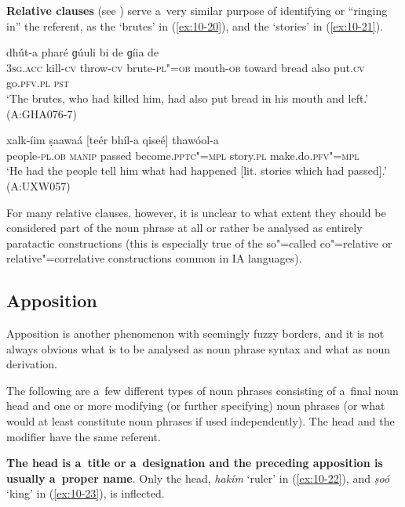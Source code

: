 \textbf{Relative clauses} (see ) serve a~very similar purpose of identifying or ``ringing in''
the referent, as the `brutes' in (\ref{ex:10-20}), and the `stories' in (\ref{ex:10-21}).

\begin{exe}
\ex
\label{ex:10-20}
\gll [tas mheer-í ɡal-í zaalim"=aan-óom] dhút-a pharé ɡúuli bi de ɡíia de \\
\textsc{3sg.acc} kill-\textsc{cv} throw-\textsc{cv} brute-\textsc{pl"=ob} mouth-\textsc{ob} toward  bread also put.\textsc{cv} go.\textsc{pfv.pl} \textsc{pst} \\
\glt `The brutes, who had killed him, had also put bread in his mouth and left.' (A:GHA076-7)

\ex
\label{ex:10-21}
\gll xalk-íim ṣaawaá [teér bhíl-a qiseé] thawóol-a \\
people-\textsc{pl.ob} \textsc{manip} passed become.\textsc{pptc"=mpl} story.\textsc{pl} make.do.\textsc{pfv"=mpl} \\
\glt `He had the people tell him what had happened [lit. stories which had passed].' (A:UXW057)
\end{exe}

For many relative clauses, however, it is unclear to what extent they should be considered part of the noun phrase at all or rather be analysed as entirely paratactic constructions (this is especially true of the so"=called co"=relative or relative"=correlative constructions common in IA languages). 


\subsection{Apposition}
\label{subsec:10-1-3}

Apposition is another phenomenon with seemingly fuzzy borders, and it is not always obvious what is to be analysed as noun phrase syntax and what as noun derivation.


The following are a~few different types of noun phrases consisting of a~final noun head and one or more modifying (or further specifying) noun phrases (or what would at least constitute noun phrases if used independently). The head and the modifier have the same referent.


\textbf{The head is a~title or a~designation and the preceding apposition is usually a~proper name}. Only the head, \textit{hakím} `ruler' in (\ref{ex:10-22}), and \textit{ṣoó} `king' in (\ref{ex:10-23}), is inflected.

